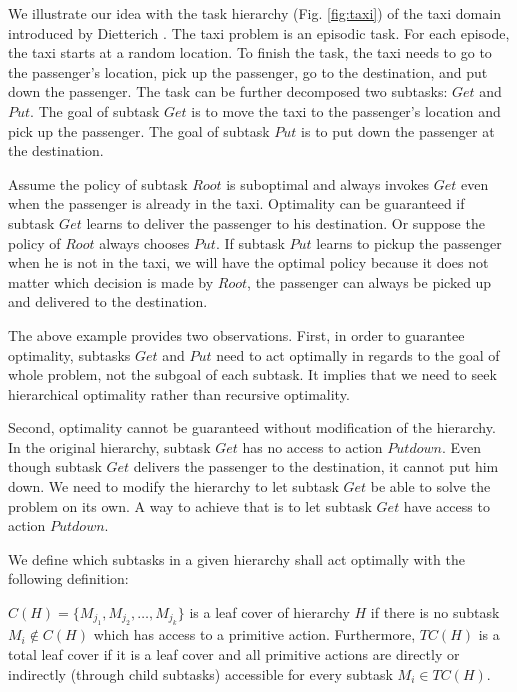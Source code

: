 
We illustrate our idea with the task hierarchy (Fig. \ref{fig:taxi}) of the taxi domain introduced by Dietterich \cite{MaxQJ}.
The taxi problem is an episodic task. For each episode, the taxi starts
at a random location. To finish the task, the taxi needs to go to the passenger's location, pick up the passenger,
go to the destination, and put down the passenger. The task can be further decomposed two subtasks: $Get$ and $Put$. 
The goal of subtask $Get$ is to move the taxi to the passenger's location and pick up the passenger. The goal of 
subtask $Put$ is to put down the passenger at the destination.

Assume the policy of subtask $Root$ is suboptimal and always invokes $Get$ even when 
the passenger is already in the taxi. Optimality can be guaranteed if subtask $Get$
learns to deliver the passenger to his destination.
Or suppose the policy of $Root$ always chooses $Put$.
If subtask $Put$ learns to pickup the passenger when he is not in the taxi, 
we will have the optimal policy because it does not matter which decision is made 
by $Root$, the passenger can always be picked up and delivered to the destination.

The above example provides two observations.
First, in order to guarantee optimality, subtasks $Get$ and $Put$ need 
to act optimally in regards to the goal of whole problem, not 
the subgoal of each subtask. It implies that we need to seek hierarchical optimality
rather than recursive optimality.

Second, optimality cannot be guaranteed without modification of the hierarchy. In the original hierarchy, 
subtask $Get$ has no access to action $Putdown$. Even though subtask $Get$ delivers the passenger to the destination,
it cannot put him down. We need to modify the hierarchy to let subtask $Get$ be
able to solve the problem on its own. A way to achieve that is to let subtask $Get$ have access
to action $Putdown$. 


We define which subtasks in a given hierarchy shall act optimally with the following definition:
\begin{definition}
    $C(H) = \{M_{j_1}, M_{j_2}, \dots, M_{j_k}\}$ is a leaf cover of hierarchy $H$ 
    if there is no subtask $M_i \notin C(H)$ which has access to a primitive action.
    Furthermore, $TC(H)$ is a total leaf cover if it is a leaf cover and all primitive
    actions are directly or indirectly (through child subtasks) accessible for every 
    subtask $M_i \in TC(H)$.
\end{definition}

